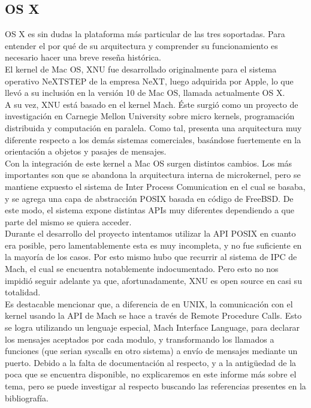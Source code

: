\subsection{OS X}

OS X es sin dudas la plataforma más particular de las tres soportadas. Para
entender el por qué de su arquitectura y comprender su funcionamiento es
necesario hacer una breve reseña histórica.\\

El kernel de Mac OS, XNU fue desarrollado originalmente para el sistema
operativo NeXTSTEP de la empresa NeXT, luego adquirida por Apple, lo que llevó
a su inclusión en la versión 10 de Mac OS, llamada actualmente OS X.\\

A su vez, XNU está basado en el kernel Mach. Éste surgió como un proyecto de
investigación en Carnegie Mellon University sobre micro kernels, programación
distribuida y computación en paralela. Como tal, presenta una arquitectura muy
diferente respecto a los demás sistemas comerciales, basándose fuertemente en la
orientación a objetos y pasajes de mensajes.\\

Con la integración de este kernel a Mac OS surgen distintos cambios. Los más
importantes son que se abandona la arquitectura interna de microkernel, pero se
mantiene expuesto el sistema de Inter Process Comunication en el cual se
basaba, y se agrega una capa de abstracción POSIX basada en código de FreeBSD.
De este modo, el sistema expone distintas APIs muy diferentes dependiendo a que
parte del mismo se quiera acceder.\\

Durante el desarrollo del proyecto intentamos utilizar la API POSIX en cuanto
era posible, pero lamentablemente esta es muy incompleta, y no fue suficiente
en la mayoría de los casos. Por esto mismo hubo que recurrir al sistema de IPC
de Mach, el cual se encuentra notablemente indocumentado. Pero esto no nos impidió
seguir adelante ya que, afortunadamente, XNU es open source en casi su totalidad. \\

Es destacable mencionar que, a diferencia de en UNIX, la comunicación con el
kernel usando la API de Mach se hace a través de Remote Procedure Calls. Esto
se logra utilizando un lenguaje especial, Mach Interface Language, para
declarar los mensajes aceptados por cada modulo, y transformando los llamados a
funciones (que serian syscalls en otro sistema) a envío de mensajes mediante un
puerto.  Debido a la falta de documentación al respecto, y a la antigüedad de
la poca que se encuentra disponible, no explicaremos en este informe más sobre
el tema, pero se puede investigar al respecto buscando las referencias
presentes en la bibliografía.\\

